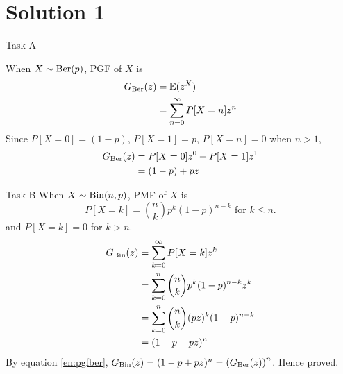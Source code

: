 \chapter{Solution 1}

\begin{task}{ Task A }

	When $X\sim\text{Ber}(p)$, PGF of $X$ is
	\begin{align}
		G_{\text{Ber}}(z) & = \mathbb{E}(z^X)                     \\
		          & = \sum_{n=0}^\infty P[X=n]z^n
	\end{align}
	Since $P[X=0]=(1-p)$, $P[X=1] = p$, $P[X=n]=0$ when $n>1$,
	\begin{align}
		G_{\text{Ber}}(z) & = P[X=0]z^0 + P[X=1]z^1 \\
		          & = (1-p) + pz
		\label{en:pgfber}
	\end{align}

\end{task}


\begin{task}{ Task B }
	When $X\sim\text{Bin}(n,p)$, PMF of $X$ is
	\begin{equation}
		P[X=k] = \binom{n}{k}p^k(1-p)^{n-k} \text{  for  } k\leq n.
	\end{equation}
	and $P[X=k]=0$ for $k>n$.
	\begin{align}
		G_{\text{Bin}}(z) & = \sum_{k=0}^\infty P[X=k]z^k                \\
		          & = \sum_{k=0}^n \binom{n}{k}p^k(1-p)^{n-k}z^k \\
		          & = \sum_{k=0}^n \binom{n}{k}(pz)^k(1-p)^{n-k} \\
		          & = (1 - p + pz)^n
		\label{en:pgfbin}
	\end{align}
	By equation \ref{en:pgfber}, $G_{\text{Bin}}(z) = (1-p + pz)^n = \left(G_{\text{Ber}}(z)\right)^n$.
	Hence proved.
\end{task}

